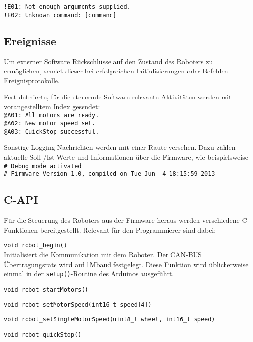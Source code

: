 \lstinline{!E01: Not enough arguments supplied.}\\
\lstinline{!E02: Unknown command: [command]}\\


\subsection{Ereignisse}
Um externer Software Rückschlüsse auf den Zustand des Roboters zu ermöglichen, sendet dieser bei erfolgreichen Initialisierungen oder Befehlen Ereignisprotokolle.

Fest definierte, für die steuernde Software relevante Aktivitäten werden mit vorangestelltem Index gesendet:\\
\lstinline{@A01: All motors are ready.}\\
\lstinline{@A02: New motor speed set.}\\
\lstinline{@A03: QuickStop successful.}

Sonstige Logging-Nachrichten werden mit einer Raute versehen.
Dazu zählen aktuelle Soll-/Ist-Werte und Informationen über die Firmware, wie beispielsweise\\
\lstinline{# Debug mode activated}\\
\lstinline{# Firmware Version 1.0, compiled on Tue Jun  4 18:15:59 2013}


\subsection{C-API}
Für die Steuerung des Roboters aus der Firmware heraus werden verschiedene C-Funktionen bereitgestellt. Relevant für den Programmierer sind dabei:

\begin{description}
\item \lstinline{void robot_begin()} \\
Initialisiert die Kommunikation mit dem Roboter. Der CAN-BUS Übertragungsrate wird auf 1Mbaud festgelegt. Diese Funktion wird üblicherweise einmal in der \lstinline{setup()}-Routine des Arduinos ausgeführt.

\item \lstinline{void robot_startMotors()} \\


\item \lstinline{void robot_setMotorSpeed(int16_t speed[4])} \\
\item \lstinline{void robot_setSingleMotorSpeed(uint8_t wheel, int16_t speed)} \\
\item \lstinline{void robot_quickStop()} \\
\end{description}

